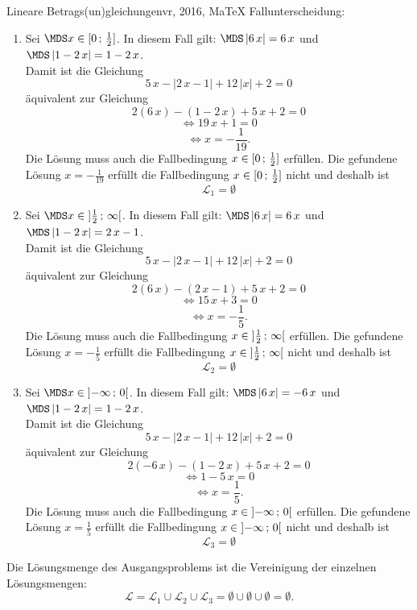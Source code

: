 \begin{MAufgabe}{Lineare Betrags(un)gleichungen}{vr, 2016, MaTeX}
 Fallunterscheidung: 

 \begin{enumerate} 
 \item Sei $ \MDS x\in[ 0 \, \MIntvlSep \, \frac{1}{2}]$. 
 In diesem Fall gilt: 
  $ \MDS \left| 6\, x\right|=6\, x$ und $ \MDS \left| 1 - 2\, x\right|=1 - 2\, x$. \\ 
 Damit ist die Gleichung 
 $$ 
5\, x - \left|2\, x - 1\right| + 12\, \left|x\right| + 2= 0
$$
 \"aquivalent zur Gleichung
 $$ 
2\left(6\, x\right)-\left( 1 - 2\, x\right)+5\, x+2= 0 
$$  
$$ 
 \Leftrightarrow 19\, x + 1= 0 
$$  
$$ \Leftrightarrow x = - \frac{1}{19} . 
 $$ 
 Die L\"osung muss auch die Fallbedingung $x\in [ 0 \, ; \, \frac{1}{2}] $ erf\"ullen. Die gefundene L\"osung $x=- \frac{1}{19}$ erf\"ullt die Fallbedingung  $x\in [ 0 \, ; \, \frac{1}{2}]$ nicht und deshalb ist  $$
 \mathcal{L}_{1}=\emptyset 
 $$ 
\item Sei $ \MDS x\in\MoIl  \frac{1}{2} \, \MIntvlSep \, \infty\MoIr $. 
 In diesem Fall gilt: 
  $ \MDS \left| 6\, x\right|=6\, x$ und $ \MDS \left| 1 - 2\, x\right|=2\, x - 1$. \\ 
 Damit ist die Gleichung 
 $$ 
5\, x - \left|2\, x - 1\right| + 12\, \left|x\right| + 2= 0
$$
 \"aquivalent zur Gleichung
 $$ 
2\left(6\, x\right)-\left( 2\, x - 1\right)+5\, x+2= 0 
$$  
$$ 
 \Leftrightarrow 15\, x + 3= 0 
$$  
$$ \Leftrightarrow x = - \frac{1}{5} . 
 $$ 
 Die L\"osung muss auch die Fallbedingung $x\in \mbox{}]\mathopen{}  \frac{1}{2} \, ; \, \infty[\mbox{}  $ erf\"ullen. Die gefundene L\"osung $x=- \frac{1}{5}$ erf\"ullt die Fallbedingung  $x\in \mbox{}]\mathopen{}  \frac{1}{2} \, ; \, \infty[\mbox{} $ nicht und deshalb ist  $$
 \mathcal{L}_{2}=\emptyset 
 $$ 
\item Sei $ \MDS x\in\MoIl  -\infty \, \MIntvlSep \, 0\MoIr $. 
 In diesem Fall gilt: 
  $ \MDS \left| 6\, x\right|=- 6\, x$ und $ \MDS \left| 1 - 2\, x\right|=1 - 2\, x$. \\ 
 Damit ist die Gleichung 
 $$ 
5\, x - \left|2\, x - 1\right| + 12\, \left|x\right| + 2= 0
$$
 \"aquivalent zur Gleichung
 $$ 
2\left(- 6\, x\right)-\left( 1 - 2\, x\right)+5\, x+2= 0 
$$  
$$ 
 \Leftrightarrow 1 - 5\, x= 0 
$$  
$$ \Leftrightarrow x = \frac{1}{5} . 
 $$ 
 Die L\"osung muss auch die Fallbedingung $x\in \mbox{}]\mathopen{}  -\infty \, ; \, 0[\mbox{}  $ erf\"ullen. Die gefundene L\"osung $x=\frac{1}{5}$ erf\"ullt die Fallbedingung  $x\in \mbox{}]\mathopen{}  -\infty \, ; \, 0[\mbox{} $ nicht und deshalb ist  $$
 \mathcal{L}_{3}=\emptyset 
 $$ 
 \end{enumerate} 
  Die L\"osungsmenge des Ausgangsproblems ist die Vereinigung der einzelnen L\"osungsmengen: 
$$ \mathcal{L} = \mathcal{L}_{1} \cup \mathcal{L}_{2} \cup \mathcal{L}_{3} 
 = \emptyset\cup \emptyset\cup \emptyset 
   =\emptyset 
   . $$ 
 

\end{MAufgabe}
